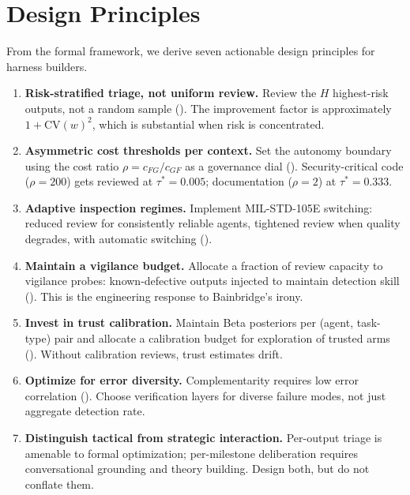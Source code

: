 \documentclass[11pt, a4paper, copyright]{googledeepmind}
\begin{document}
\section{Design Principles}
\label{sec:principles}

From the formal framework, we derive seven actionable design principles for harness builders.

\begin{enumerate}[leftmargin=*]
\item \textbf{Risk-stratified triage, not uniform review.} Review the $H$ highest-risk outputs, not a random sample (). The improvement factor is approximately $1 + \text{CV}(w)^2$, which is substantial when risk is concentrated.

\item \textbf{Asymmetric cost thresholds per context.} Set the autonomy boundary using the cost ratio $\rho = c_{FG}/c_{GF}$ as a governance dial (). Security-critical code ($\rho = 200$) gets reviewed at $\tau^* = 0.005$; documentation ($\rho = 2$) at $\tau^* = 0.333$.

\item \textbf{Adaptive inspection regimes.} Implement MIL-STD-105E switching: reduced review for consistently reliable agents, tightened review when quality degrades, with automatic switching ().

\item \textbf{Maintain a vigilance budget.} Allocate a fraction of review capacity to vigilance probes: known-defective outputs injected to maintain detection skill (). This is the engineering response to Bainbridge's irony.

\item \textbf{Invest in trust calibration.} Maintain Beta posteriors per (agent, task-type) pair and allocate a calibration budget for exploration of trusted arms (). Without calibration reviews, trust estimates drift.

\item \textbf{Optimize for error diversity.} Complementarity requires low error correlation (). Choose verification layers for diverse failure modes, not just aggregate detection rate.

\item \textbf{Distinguish tactical from strategic interaction.} Per-output triage is amenable to formal optimization; per-milestone deliberation requires conversational grounding and theory building. Design both, but do not conflate them.
\end{enumerate}
\end{document}
